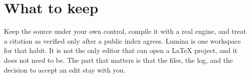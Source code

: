 \section{What to keep}
\label{sec:closing}

Keep the source under your own control, compile it with a real engine, and treat a citation as verified only after a public index agrees.
Lumina is one workspace for that habit.
It is not the only editor that can open a \LaTeX{} project, and it does not need to be.
The part that matters is that the files, the log, and the decision to accept an edit stay with you.
